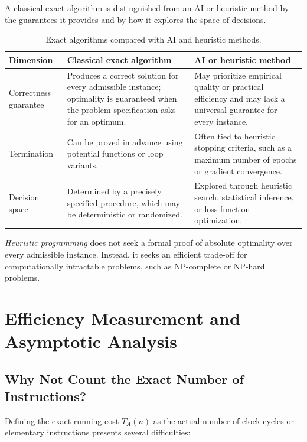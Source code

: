 A classical exact algorithm is distinguished from an AI or heuristic method
by the guarantees it provides and by how it explores the space of decisions.

\begin{table}[H]
  \centering
  \caption{Exact algorithms compared with AI and heuristic methods.}
  \label{tab:algorithm-comparison}
  \begin{tabularx}{\textwidth}{@{}>{\raggedright\arraybackslash}p{}YY@{}}
    \toprule
    Dimension & Classical exact algorithm & AI or heuristic method \\
    \midrule
    Correctness guarantee & Produces a correct solution for every admissible
      instance; optimality is guaranteed when the problem specification asks
      for an optimum. & May prioritize empirical quality or practical
      efficiency and may lack a universal guarantee for every instance. \\
    Termination & Can be proved in advance using potential functions or loop
      variants. & Often tied to heuristic stopping criteria, such as a maximum
      number of epochs or gradient convergence. \\
    Decision space & Determined by a precisely specified procedure, which may
      be deterministic or randomized. & Explored through heuristic search,
      statistical inference, or loss-function optimization. \\
    \bottomrule
  \end{tabularx}
\end{table}

\emph{Heuristic programming} does not seek a formal proof of absolute
optimality over every admissible instance. Instead, it seeks an efficient
trade-off for computationally intractable problems, such as NP-complete or
NP-hard problems.

\section{Efficiency Measurement and Asymptotic Analysis}
\label{sec:asymptotic-analysis}

\subsection{Why Not Count the Exact Number of Instructions?}

Defining the exact running cost $T_A(n)$ as the actual number of clock cycles
or elementary instructions presents several difficulties:

